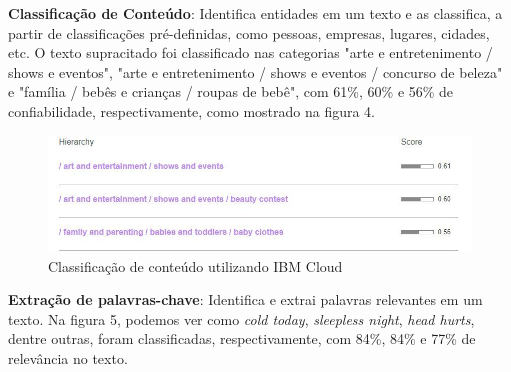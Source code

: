 \documentclass{article}
\begin{document}
\textbf{Classificação de Conteúdo}: Identifica entidades em um texto e as classifica, a partir de classificações pré-definidas, como pessoas, empresas, lugares, cidades, etc. O texto supracitado foi classificado nas categorias "arte e entretenimento / shows e eventos", "arte e entretenimento / shows e eventos / concurso de beleza" e "família / bebês e crianças / roupas de bebê", com 61\%, 60\% e 56\% de confiabilidade, respectivamente, como mostrado na figura 4. \\
\begin{figure}[H]
    \centering
    \includegraphics[scale=0.5]{imagens/nlp_classificacao.jpg}
    \caption{Classificação de conteúdo utilizando IBM Cloud}
    \label{fig:nlp_classificacao}
\end{figure}{}
\textbf{Extração de palavras-chave}: Identifica e extrai palavras relevantes em um texto. Na figura 5, podemos ver como \textit{cold today}, \textit{sleepless night}, \textit{head hurts}, dentre outras, foram classificadas, respectivamente, com 84\%, 84\% e 77\% de relevância no texto. \\
\end{document}
